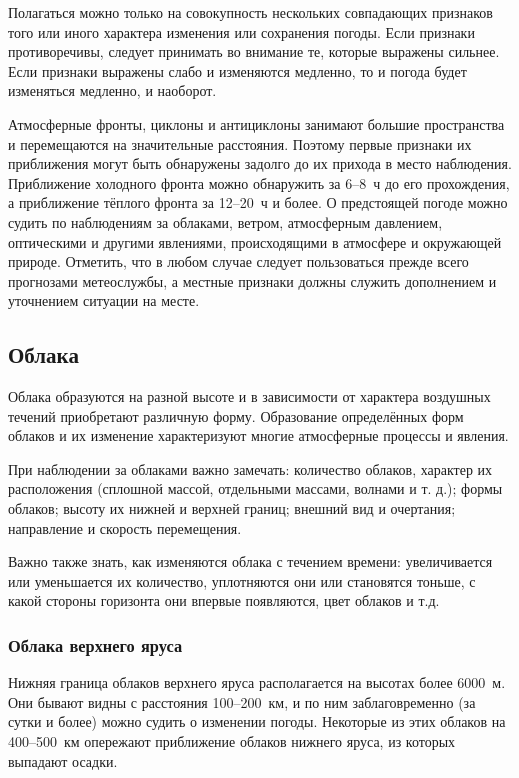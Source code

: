 Полагаться можно только на совокупность нескольких совпадающих
признаков того или иного характера изменения или сохранения
погоды. Если признаки противоречивы, следует принимать во внимание те,
которые выражены сильнее. Если признаки выражены слабо и изменяются
медленно, то и погода будет изменяться медленно, и наоборот.

Атмосферные фронты, циклоны и антициклоны занимают большие
пространства и перемещаются на значительные расстояния. Поэтому первые
признаки их приближения могут быть обнаружены задолго до их прихода в
место наблюдения. Приближение холодного фронта можно обнаружить за 6--8~ч
до его прохождения, а приближение тёплого фронта за 12--20~ч и
более. О предстоящей погоде можно судить по наблюдениям за облаками,
ветром, атмосферным давлением, оптическими и другими явлениями,
происходящими в атмосфере и окружающей природе. Отметить, что в любом
случае следует пользоваться прежде всего прогнозами метеослужбы, а
местные признаки должны служить дополнением и уточнением ситуации на
месте.

\subsection{Облака}

Облака образуются на разной высоте и в зависимости от характера
воздушных течений приобретают различную форму. Образование
определённых форм облаков и их изменение характеризуют многие
атмосферные процессы и явления.

При наблюдении за облаками важно замечать: количество облаков,
характер их расположения (сплошной массой, отдельными массами, волнами
и т. д.); формы облаков; высоту их нижней и верхней границ; внешний
вид и очертания; направление и скорость перемещения.

Важно также знать, как изменяются облака с течением времени:
увеличивается или уменьшается их количество, уплотняются они или
становятся тоньше, с какой стороны горизонта они впервые появляются,
цвет облаков и т.д.

\subsubsection{Облака верхнего яруса}

Нижняя граница облаков верхнего яруса располагается на высотах более
6000~м. Они бывают видны с расстояния 100--200~км, и по ним
заблаговременно (за сутки и более) можно судить о изменении
погоды. Некоторые из этих облаков на 400--500~км опережают
приближение облаков нижнего яруса, из которых выпадают осадки.

